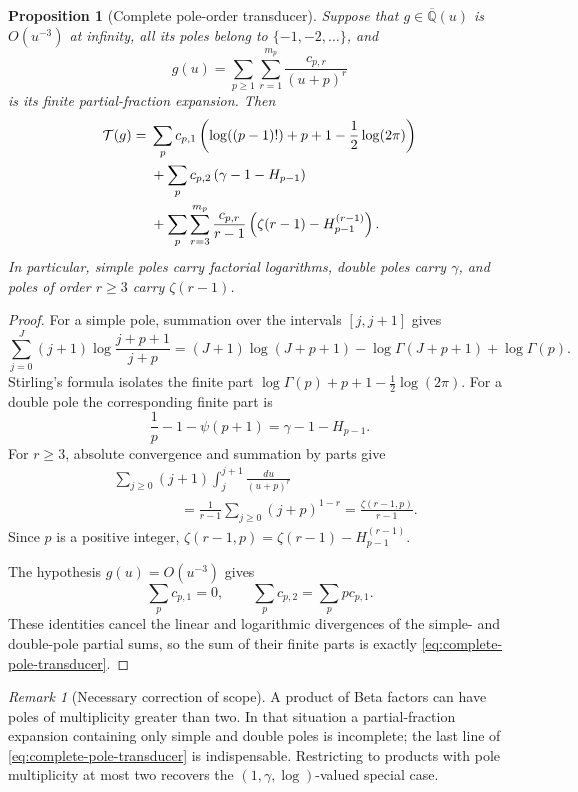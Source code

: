 \documentclass[11pt]{article}
\newtheorem{proposition}[theorem]{Proposition}
\theoremstyle{definition}
\theoremstyle{remark}
\newtheorem{remark}[theorem]{Remark}
\newcommand{\Qbar}{\overline{\mathbb Q}}
\begin{document}
\begin{proposition}[Complete pole-order transducer]
\label{prop:complete-pole-transducer}
Suppose that \(g\in\Qbar(u)\) is \(O(u^{-3})\) at infinity, all its poles
belong to \(\{-1,-2,\ldots\}\), and
\[
 g(u)=\sum_{p\ge1}\sum_{r=1}^{m_p}
       \frac{c_{p,r}}{(u+p)^r}
\]
is its finite partial-fraction expansion.  Then
\begin{align}
 \mathcal T(g)
 ={}&\sum_p c_{p,1}
 \left(\log((p-1)!)+p+1-\frac12\log(2\pi)\right)
 \notag\\
 &+\sum_p c_{p,2}\left(\gamma-1-H_{p-1}\right)
 \label{eq:complete-pole-transducer}\\
 &+\sum_p\sum_{r=3}^{m_p}
 \frac{c_{p,r}}{r-1}
 \left(\zeta(r-1)-H_{p-1}^{(r-1)}\right).
 \notag
\end{align}
In particular, simple poles carry factorial logarithms, double poles carry
\(\gamma\), and poles of order \(r\ge3\) carry \(\zeta(r-1)\).
\end{proposition}

\begin{proof}
For a simple pole, summation over the intervals \([j,j+1]\) gives
\[
 \sum_{j=0}^J(j+1)
 \log\frac{j+p+1}{j+p}
 =(J+1)\log(J+p+1)-\log\Gamma(J+p+1)+\log\Gamma(p).
\]
Stirling's formula isolates the finite part
\(\log\Gamma(p)+p+1-\frac12\log(2\pi)\).
For a double pole the corresponding finite part is
\[
 \frac1p-1-\psi(p+1)=\gamma-1-H_{p-1}.
\]
For \(r\ge3\), absolute convergence and summation by parts give
\begin{align*}
 &\sum_{j\ge0}(j+1)\int_j^{j+1}\frac{du}{(u+p)^r}\\
 &\hspace{2cm}=\frac1{r-1}\sum_{j\ge0}(j+p)^{1-r}
 =\frac{\zeta(r-1,p)}{r-1}.
\end{align*}
Since \(p\) is a positive integer,
\(\zeta(r-1,p)=\zeta(r-1)-H_{p-1}^{(r-1)}\).

The hypothesis \(g(u)=O(u^{-3})\) gives
\[
 \sum_pc_{p,1}=0,
 \qquad
 \sum_pc_{p,2}=\sum_ppc_{p,1}.
\]
These identities cancel the linear and logarithmic divergences of the
simple- and double-pole partial sums, so the sum of their finite parts is
exactly \eqref{eq:complete-pole-transducer}.
\end{proof}

\begin{remark}[Necessary correction of scope]
A product of Beta factors can have poles of multiplicity greater than two.
In that situation a partial-fraction expansion containing only simple and
double poles is incomplete; the last line of
\eqref{eq:complete-pole-transducer} is indispensable.  Restricting to
products with pole multiplicity at most two recovers the
\((1,\gamma,\log)\)-valued special case.
\end{remark}
\end{document}
